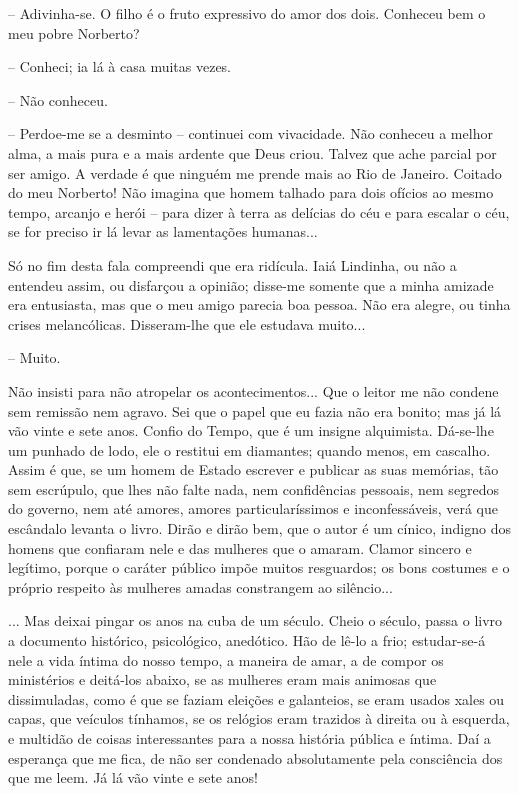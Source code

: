 -- Adivinha-se. O filho é o fruto expressivo do amor dos dois. Conheceu
bem o meu pobre Norberto?

-- Conheci; ia lá à casa muitas vezes.

-- Não conheceu.

-- Perdoe-me se a desminto -- continuei com vivacidade. Não conheceu a
melhor alma, a mais pura e a mais ardente que Deus criou. Talvez que
ache parcial por ser amigo. A verdade é que ninguém me prende mais ao
Rio de Janeiro. Coitado do meu Norberto! Não imagina que homem talhado
para dois ofícios ao mesmo tempo, arcanjo e herói -- para dizer à terra
as delícias do céu e para escalar o céu, se for preciso ir lá levar as
lamentações humanas...

Só no fim desta fala compreendi que era ridícula. Iaiá Lindinha, ou não
a entendeu assim, ou disfarçou a opinião; disse-me somente que a minha
amizade era entusiasta, mas que o meu amigo parecia boa pessoa. Não era
alegre, ou tinha crises melancólicas. Disseram-lhe que ele estudava
muito...

-- Muito.

Não insisti para não atropelar os acontecimentos... Que o leitor me não
condene sem remissão nem agravo. Sei que o papel que eu fazia não era
bonito; mas já lá vão vinte e sete anos. Confio do Tempo, que é um
insigne alquimista. Dá-se-lhe um punhado de lodo, ele o restitui em
diamantes; quando menos, em cascalho. Assim é que, se um homem de Estado
escrever e publicar as suas memórias, tão sem escrúpulo, que lhes não
falte nada, nem confidências pessoais, nem segredos do governo, nem até
amores, amores particularíssimos e inconfessáveis, verá que escândalo
levanta o livro. Dirão e dirão bem, que o autor é um cínico, indigno dos
homens que confiaram nele e das mulheres que o amaram. Clamor sincero e
legítimo, porque o caráter público impõe muitos resguardos; os bons
costumes e o próprio respeito às mulheres amadas constrangem ao
silêncio...

... Mas deixai pingar os anos na cuba de um século. Cheio o século,
passa o livro a documento histórico, psicológico, anedótico. Hão de
lê-lo a frio; estudar-se-á nele a vida íntima do nosso tempo, a maneira
de amar, a de compor os ministérios e deitá-los abaixo, se as mulheres
eram mais animosas que dissimuladas, como é que se faziam eleições e
galanteios, se eram usados xales ou capas, que veículos tínhamos, se os
relógios eram trazidos à direita ou à esquerda, e multidão de coisas
interessantes para a nossa história pública e íntima. Daí a esperança
que me fica, de não ser condenado absolutamente pela consciência dos que
me leem. Já lá vão vinte e sete anos!

